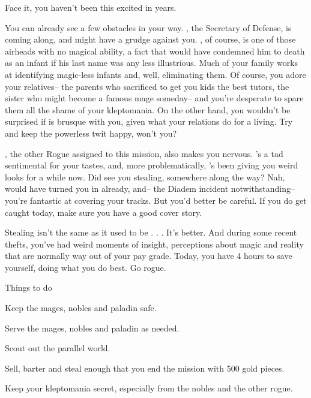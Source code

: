 \documentclass[char]{guildcamp3}
\begin{document}
Face it, you haven't been this excited in years.

You can already see a few obstacles in your way. \cNobleOne, the Secretary of Defense, is coming along, and \cNobleOne{\they} might have a grudge against you.  \cNobleOne{\they}, of course, is one of those airheads with no magical ability, a fact that would have condemned him to death as an infant if his last name was any less illustrious. Much of your family works at identifying magic-less infants and, well, eliminating them. Of course, you adore your relatives-- the parents who sacrificed to get you kids the best tutors, the sister who might become a famous mage someday-- and you're desperate to spare them all the shame of your kleptomania. On the other hand, you wouldn't be surprised if \cNobleOne is brusque with you, given what your relations do for a living. Try and keep the powerless twit happy, won't you? 

\cRogueOne, the other Rogue assigned to this mission, also makes you nervous. \cRogueOne{\they}'s a tad sentimental for your tastes, and, more problematically, \cRogueOne{\they}'s been giving you weird looks for a while now. Did \cRogueOne{\they} see you stealing, somewhere along the way? Nah, \cRogueOne{\they} would have turned you in already, and-- the Diadem incident notwithstanding-- you're fantastic at covering your tracks. But you'd better be careful. If you do get caught today, make sure you have a good cover story.

Stealing isn't the same as it used to be . . . It's better. And during some recent thefts, you've had weird moments of insight, perceptions about magic and reality that are normally way out of your pay grade.  Today, you have 4 hours to save yourself, doing what you do best. Go rogue.


\begin{itemz}[Goals]
 \item Things to do
  \item Keep the mages, nobles and paladin safe.
  \item Serve the mages, nobles and paladin as needed.
  \item Scout out the parallel world.
  \item Sell, barter and steal enough that you end the mission with 500 gold pieces.
  \item Keep your kleptomania secret, especially from the nobles and the other rogue.  
\end{itemz}
\end{document}

